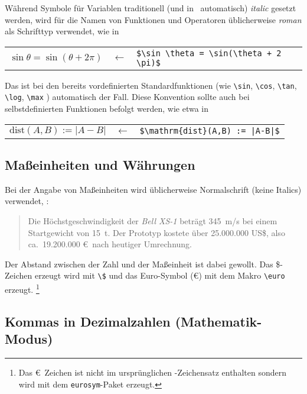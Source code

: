 Während Symbole für Variablen traditionell (und in \latex\ automatisch)
\emph{italic} gesetzt werden, wird für die Namen von Funktionen und
Operatoren üblicherweise \emph{roman} als Schrifttyp verwendet, wie \zB in
%
\begin{center}
	\begin{tabular}{lcl}
		$\sin \theta = \sin(\theta + 2 \pi)$ &
		$\leftarrow$ & \verb!$\sin \theta = \sin(\theta + 2 \pi)$! \\
	\end{tabular}
\end{center}
%
Das ist bei den bereits vordefinierten Standardfunktionen (wie \verb!\sin!,
\verb!\cos!, \verb!\tan!, \verb!\log!, \verb!\max! \uva) automatisch der Fall.
Diese Konvention sollte auch bei selbstdefinierten Funktionen befolgt werden,
wie etwa in
%
\begin{center}
	\begin{tabular}{lcl}
	$\mathrm{dist}(A,B) := |A-B|$ & $\leftarrow$ & 
	\verb!$\mathrm{dist}(A,B) := |A-B|$! \\
	\end{tabular}
\end{center}


\subsection{Maßeinheiten und Währungen}

Bei der Angabe von Maßeinheiten wird üblicherweise Normalschrift (keine
Italics) verwendet, \zB:
%
\begin{quote}
	Die Höchstgeschwindigkeit der \textit{Bell XS-1} beträgt 345~m/s bei
	einem Startgewicht von 15~t. Der Prototyp kostete über 25.000.000 US\$,
	also ca.\ 19.200.000 \euro\ nach heutiger Umrechnung.
\end{quote}
%
Der Abstand zwischen der Zahl und der Maßeinheit ist dabei gewollt. Das
\$-Zeichen erzeugt wird mit \verb!\$! und das Euro-Symbol (\euro) mit dem
Makro \verb!\euro! erzeugt.%
\footnote{Das \euro\ Zeichen ist nicht im ursprünglichen \latex-Zeichensatz
enthalten sondern wird mit dem \texttt{eurosym}-Paket erzeugt.}


\subsection{Kommas in Dezimalzahlen (Mathematik-Modus)}

